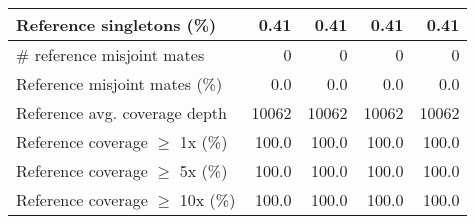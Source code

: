 \documentclass[12pt,a4paper]{article}
\begin{document}
\begin{table}[ht]
\begin{center}
\begin{tabular}{|l*{4}{|r}|}
Reference singletons (\%) & 0.41 & 0.41 & 0.41 & 0.41 \\ \hline
\# reference misjoint mates & 0 & 0 & 0 & 0 \\ \hline
Reference misjoint mates (\%) & 0.0 & 0.0 & 0.0 & 0.0 \\ \hline
Reference avg. coverage depth & 10062 & 10062 & 10062 & 10062 \\ \hline
Reference coverage $\geq$ 1x (\%) & 100.0 & 100.0 & 100.0 & 100.0 \\ \hline
Reference coverage $\geq$ 5x (\%) & 100.0 & 100.0 & 100.0 & 100.0 \\ \hline
Reference coverage $\geq$ 10x (\%) & 100.0 & 100.0 & 100.0 & 100.0 \\ \hline
\end{tabular}
\end{center}
\end{table}
\end{document}
